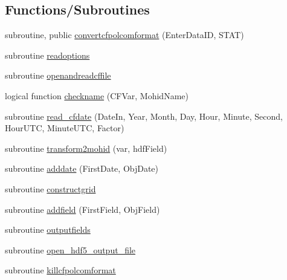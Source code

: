 \subsection*{Functions/\+Subroutines}
\begin{DoxyCompactItemize}
\item 
subroutine, public \mbox{\hyperlink{namespacemodulecfpolcomformat_a2792438e0105569c0bc2d1dc532a27b6}{convertcfpolcomformat}} (Enter\+Data\+ID, S\+T\+AT)
\item 
subroutine \mbox{\hyperlink{namespacemodulecfpolcomformat_a4c4e63e132d65e031563f05fe3a94a6e}{readoptions}}
\item 
subroutine \mbox{\hyperlink{namespacemodulecfpolcomformat_a4b22d491cfb2a95ce7441773203c2e7e}{openandreadcffile}}
\item 
logical function \mbox{\hyperlink{namespacemodulecfpolcomformat_a555e71ed3c48d8786288c63a8f0aa501}{checkname}} (C\+F\+Var, Mohid\+Name)
\item 
subroutine \mbox{\hyperlink{namespacemodulecfpolcomformat_a629c520b52ec9b466d91469b40321b35}{read\+\_\+cfdate}} (Date\+In, Year, Month, Day, Hour, Minute, Second, Hour\+U\+TC, Minute\+U\+TC, Factor)
\item 
subroutine \mbox{\hyperlink{namespacemodulecfpolcomformat_a3d0d3ed8a29201140d8429b140242edc}{transform2mohid}} (var, hdf\+Field)
\item 
subroutine \mbox{\hyperlink{namespacemodulecfpolcomformat_a06c01fa0bdcd286b18e4131ebf80a3fe}{adddate}} (First\+Date, Obj\+Date)
\item 
subroutine \mbox{\hyperlink{namespacemodulecfpolcomformat_ae48cf997b8d44143cac43f824a76058d}{constructgrid}}
\item 
subroutine \mbox{\hyperlink{namespacemodulecfpolcomformat_aeffcbf4718c74837ddf588179800f544}{addfield}} (First\+Field, Obj\+Field)
\item 
subroutine \mbox{\hyperlink{namespacemodulecfpolcomformat_a5d472a387fb496b9a4ae576e445acaa3}{outputfields}}
\item 
subroutine \mbox{\hyperlink{namespacemodulecfpolcomformat_aa08f9068cb50c9ebecda0e3eac54124c}{open\+\_\+hdf5\+\_\+output\+\_\+file}}
\item 
subroutine \mbox{\hyperlink{namespacemodulecfpolcomformat_a3017fd95b8b5cbe08856f9644c9f6533}{killcfpolcomformat}}
\end{DoxyCompactItemize}
